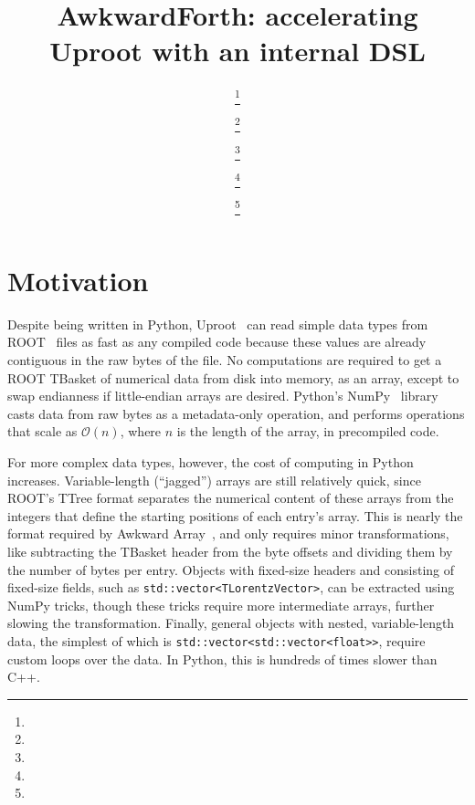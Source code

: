 \documentclass{webofc}
\begin{document}
\title{AwkwardForth: accelerating Uproot with an internal DSL}

\author{ \fnsep\thanks{} \and
         \fnsep\thanks{} \and
         \fnsep\thanks{} \and
         \fnsep\thanks{} \and
         \fnsep\thanks{}}



\maketitle

\section{Motivation}

Despite being written in Python, Uproot~\cite{uproot} can read simple data types from ROOT~\cite{root} files as fast as any compiled code because these values are already contiguous in the raw bytes of the file. No computations are required to get a ROOT TBasket of numerical data from disk into memory, as an array, except to swap endianness if little-endian arrays are desired. Python's NumPy~\cite{numpy} library casts data from raw bytes as a metadata-only operation, and performs operations that scale as $\mathcal{O}(n)$, where $n$ is the length of the array, in precompiled code.

For more complex data types, however, the cost of computing in Python increases. Variable-length (``jagged'') arrays are still relatively quick, since ROOT's TTree format separates the numerical content of these arrays from the integers that define the starting positions of each entry's array. This is nearly the format required by Awkward Array~\cite{awkward}, and only requires minor transformations, like subtracting the TBasket header from the byte offsets and dividing them by the number of bytes per entry. Objects with fixed-size headers and consisting of fixed-size fields, such as \texttt{std::vector<TLorentzVector>}, can be extracted using NumPy tricks, though these tricks require more intermediate arrays, further slowing the transformation. Finally, general objects with nested, variable-length data, the simplest of which is \texttt{std::vector<std::vector<float>>}, require custom loops over the data. In Python, this is hundreds of times slower than C++.
\end{document}
